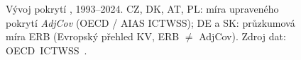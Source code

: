 \def\strEuPokrytiKvVyvojTitle{Pokrytí \aclins{KS}}%
\def\strEuPokrytiKvVyvojYlabel{pokrytí \acs{KS} [\%]}%
\def\strEuPokrytiKvVyvojCaption{Vývoj pokrytí \aclins{KS}, 1993--2024. CZ, DK, AT, PL: míra upraveného pokrytí \textit{AdjCov} (OECD / AIAS ICTWSS); DE a SK: průzkumová míra ERB (Evropský přehled KV, ERB \(\neq\) AdjCov). Zdroj dat: \acs{OECD}~\acs{ICTWSS}~\cite{oecd_aias_ictwss_CBC_ERB_pct}.}%
%
\begin{figure}[H]
  \centering
  
  \caption{\strEuPokrytiKvVyvojCaption}
  \label{fig:eu_pokryti_kv_vyvoj}
\end{figure}
